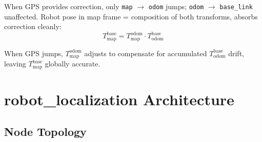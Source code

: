 \documentclass[11pt,a4paper]{article}
\begin{document}
When GPS provides correction, only \texttt{map} $\to$ \texttt{odom} jumps; \texttt{odom} $\to$ \texttt{base\_link} unaffected. Robot pose in map frame = composition of both transforms, absorbs correction cleanly:
\[
T_{\text{map}}^{\text{base}} = T_{\text{map}}^{\text{odom}} \cdot T_{\text{odom}}^{\text{base}}
\]

When GPS jumps, $T_{\text{map}}^{\text{odom}}$ adjusts to compensate for accumulated $T_{\text{odom}}^{\text{base}}$ drift, leaving $T_{\text{map}}^{\text{base}}$ globally accurate.

\section{robot\_localization Architecture}

\subsection{Node Topology}
\end{document}
